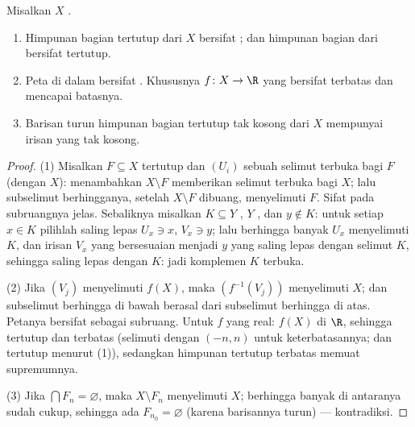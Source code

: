 \begin{theorem}\label{thm:b3:topology:compactprops}
Misalkan $X$ .
\begin{enumerate}
  \item Himpunan bagian tertutup dari $X$ bersifat ; dan himpunan bagian  dari
         bersifat tertutup.
  \item Peta   di dalam 
        bersifat . Khususnya $f\colon X
        \to \R$ yang  bersifat terbatas dan mencapai batasnya.
  \item Barisan turun himpunan bagian tertutup tak kosong dari $X$
        mempunyai irisan yang tak kosong.
\end{enumerate}
\end{theorem}

\begin{proof}
(1) Misalkan $F \subseteq X$ tertutup dan $(U_i)$ sebuah selimut terbuka bagi $F$
(dengan  $X$): menambahkan $X \setminus F$ memberikan selimut terbuka bagi
$X$; lalu subselimut berhingganya, setelah $X \setminus F$ dibuang, menyelimuti $F$.
Sifat  pada subruangnya jelas. Sebaliknya misalkan $K \subseteq Y$
, $Y$ , dan $y \notin K$: untuk setiap $x \in K$
pilihlah  saling lepas $U_x \ni x$, $V_x \ni y$; lalu berhingga banyak $U_x$
menyelimuti $K$, dan irisan $V_x$ yang bersesuaian menjadi
 $y$ yang saling lepas dengan selimut $K$, sehingga saling lepas dengan $K$:
jadi komplemen $K$ terbuka.

(2) Jika $(V_j)$ menyelimuti $f(X)$, maka $(f^{-1}(V_j))$ menyelimuti $X$; dan
subselimut berhingga di bawah berasal dari subselimut berhingga di
atas. Petanya bersifat  sebagai subruang. Untuk $f$ yang real:
$f(X)$  di $\R$, sehingga tertutup dan terbatas (selimuti dengan
$(-n, n)$ untuk keterbatasannya; dan tertutup menurut (1)), sedangkan himpunan tertutup terbatas
memuat supremumnya.

(3) Jika $\bigcap F_n = \varnothing$, maka  $X \setminus F_n$
menyelimuti $X$; berhingga banyak di antaranya sudah cukup, sehingga ada $F_{n_0} =
\varnothing$ (karena barisannya turun) --- kontradiksi.
\end{proof}

